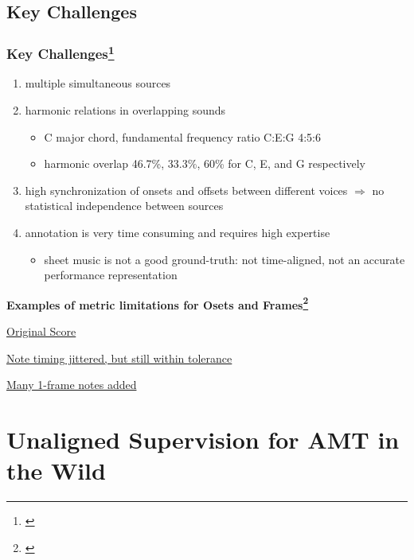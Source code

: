 \documentclass{beamer}
\newcommand{\emp}[1]{\textcolor{tum}{\textbf{#1}}}
\begin{document}
\subsection{Key Challenges}
\begin{frame}
	\frametitle{Key Challenges\footnote{\cite{Overview}}}
	\begin{enumerate}
		\item multiple simultaneous sources
		\item harmonic relations in overlapping sounds
		      \begin{itemize}
			      \item C major chord, fundamental frequency ratio C:E:G 4:5:6
			      \item harmonic overlap 46.7\%, 33.3\%, 60\% for C, E, and G respectively
		      \end{itemize}
		\item high synchronization of onsets and offsets between different voices $\Rightarrow$ no statistical independence between sources
		\item annotation is very time consuming and requires high expertise
		      \begin{itemize}
			      \item sheet music is not a good ground-truth: not time-aligned, not an accurate performance representation
		      \end{itemize}
	\end{enumerate}

	\emp{Examples of metric limitations for Osets and Frames\footnote{\cite{OF}}}

	\href{https://storage.googleapis.com/magentadata/papers/onsets-frames/fur_elise_framescore_good2.mp3}{Original Score}

	\href{https://storage.googleapis.com/magentadata/papers/onsets-frames/fur_elise_notejitter_score1.mp3}{Note timing jittered, but still within tolerance}

	\href{https://storage.googleapis.com/magentadata/papers/onsets-frames/fur_elise_framescore_bad3.mp3}{Many 1-frame notes added}

\end{frame}


\section{Unaligned Supervision for AMT in the Wild}
\end{document}
